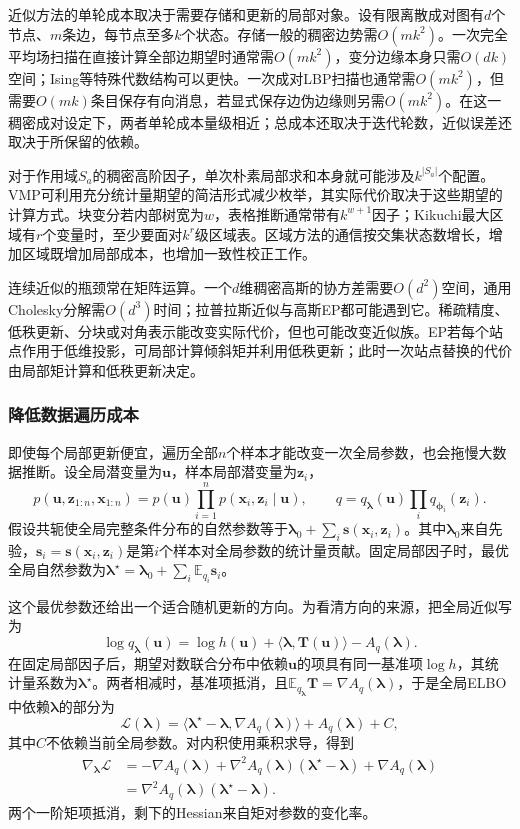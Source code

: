 近似方法的单轮成本取决于需要存储和更新的局部对象。设有限离散成对图有$d$个节点、$m$条边，每节点至多$k$个状态。存储一般的稠密边势需$O(mk^2)$。一次完全平均场扫描在直接计算全部边期望时通常需$O(mk^2)$，变分边缘本身只需$O(dk)$空间；Ising等特殊代数结构可以更快。一次成对LBP扫描也通常需$O(mk^2)$，但需要$O(mk)$条目保存有向消息，若显式保存边伪边缘则另需$O(mk^2)$。在这一稠密成对设定下，两者单轮成本量级相近；总成本还取决于迭代轮数，近似误差还取决于所保留的依赖。

对于作用域$S_a$的稠密高阶因子，单次朴素局部求和本身就可能涉及$k^{|S_a|}$个配置。VMP可利用充分统计量期望的简洁形式减少枚举，其实际代价取决于这些期望的计算方式。块变分若内部树宽为$w$，表格推断通常带有$k^{w+1}$因子；Kikuchi最大区域有$r$个变量时，至少要面对$k^r$级区域表。区域方法的通信按交集状态数增长，增加区域既增加局部成本，也增加一致性校正工作。

连续近似的瓶颈常在矩阵运算。一个$d$维稠密高斯的协方差需要$O(d^2)$空间，通用Cholesky分解需$O(d^3)$时间；拉普拉斯近似与高斯EP都可能遇到它。稀疏精度、低秩更新、分块或对角表示能改变实际代价，但也可能改变近似族。EP若每个站点作用于低维投影，可局部计算倾斜矩并利用低秩更新；此时一次站点替换的代价由局部矩计算和低秩更新决定。

\subsubsection{降低数据遍历成本}

\label{sec:pgm-variational-svi}

即使每个局部更新便宜，遍历全部$n$个样本才能改变一次全局参数，也会拖慢大数据推断。设全局潜变量为$\bm u$，样本局部潜变量为$\bm z_i$，
\[
  p(\bm u,\bm z_{1:n},\bm x_{1:n})
    =p(\bm u)\prod_{i=1}^n p(\bm x_i,\bm z_i\mid\bm u),
  \qquad
  q=q_{\bm{\lambda}}(\bm u)\prod_iq_{\bm{\phi}_i}(\bm z_i).
\]
假设共轭使全局完整条件分布的自然参数等于$\bm{\lambda}_0+\sum_i\bm s(\bm x_i,\bm z_i)$。其中$\bm\lambda_0$来自先验，$\bm s_i=\bm s(\bm x_i,\bm z_i)$是第$i$个样本对全局参数的统计量贡献。固定局部因子时，最优全局自然参数为$\bm{\lambda}^\star=\bm{\lambda}_0+\sum_i\mathbb E_{q_i}\bm s_i$。

这个最优参数还给出一个适合随机更新的方向。为看清方向的来源，把全局近似写为
\[
  \log q_{\bm\lambda}(\bm u)
    =\log h(\bm u)+\langle\bm\lambda,\bm T(\bm u)\rangle
       -A_q(\bm\lambda).
\]
在固定局部因子后，期望对数联合分布中依赖$\bm u$的项具有同一基准项$\log h$，其统计量系数为$\bm\lambda^\star$。两者相减时，基准项抵消，且$\mathbb E_{q_{\bm\lambda}}\bm T=\nabla A_q(\bm\lambda)$，于是全局ELBO中依赖$\bm{\lambda}$的部分为
\[
  \mathcal L(\bm\lambda)
    =\langle\bm{\lambda}^\star-\bm{\lambda},
            \nabla A_q(\bm{\lambda})\rangle+A_q(\bm{\lambda})+C,
\]
其中$C$不依赖当前全局参数。对内积使用乘积求导，得到
\[
  \begin{aligned}
    \nabla_{\bm\lambda}\mathcal L
      &=-\nabla A_q(\bm\lambda)
        +\nabla^2 A_q(\bm\lambda)(\bm\lambda^\star-\bm\lambda)
        +\nabla A_q(\bm\lambda)\\
      &=\nabla^2 A_q(\bm\lambda)(\bm\lambda^\star-\bm\lambda).
  \end{aligned}
\]
两个一阶矩项抵消，剩下的Hessian来自矩对参数的变化率。

